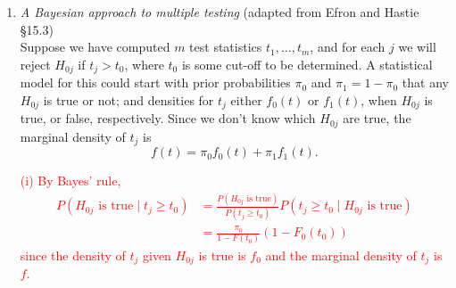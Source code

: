 \documentclass[12pt]{article}
\def\pr{{\rm pr}}
\newcommand{\1}{\mathds 1}
\begin{document}
\begin{enumerate}
\item {\em  A Bayesian approach to  multiple testing} (adapted from Efron and Hastie \S 15.3)\\
Suppose we have computed $m$ test statistics $t_1, \dots, t_m$, and for each $j$ we will reject $H_{0j}$ if $t_j > t_0$, where $t_0$ is some cut-off to be determined. A statistical model for this could start with prior probabilities $\pi_0$ and $\pi_1 = 1-\pi_0$ that any $H_{0j}$ is true or not; and densities for $t_j$ either $f_0(t)$ or $f_1(t)$,  when $H_{0j}$ is true, or false, respectively. Since we don't know which $H_{0j}$ are true, the marginal density of $t_j$ is
\begin{equation}
f(t) = \pi_0 f_0(t) + \pi_1f_1(t).
\end{equation}

\textcolor{red}{
(i) By Bayes' rule, 
\begin{align*}
    P(H_{0j} \text{ is true} \mid t_j \geq t_0) &= \frac{P(H_{0j} \text{ is true})}{P(t_j \geq t_0)} P(t_j \geq t_0 \mid H_{0j} \text{ is true})\\
    &= \frac{\pi_0}{1 - F(t_0)} (1 - F_0 (t_0))
\end{align*}
since the density of $t_j$ given $H_{0j}$ is true is $f_0$ and the marginal density of $t_j$ is $f$. 
}


\end{enumerate}
\end{document}
